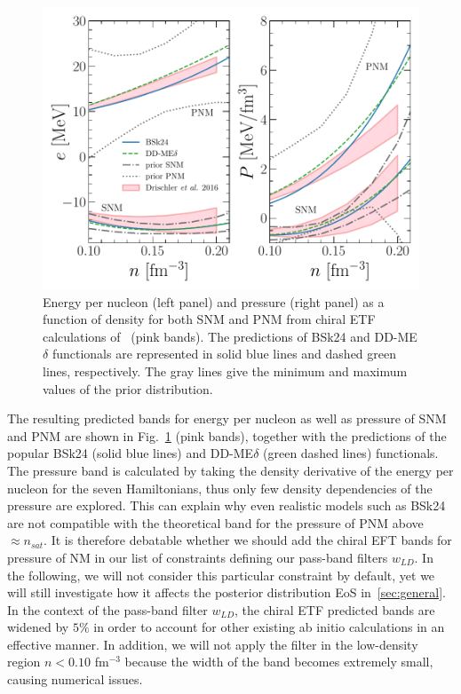 \begin{figure}[!t]
\begin{center}
  \includegraphics[width=0.9\linewidth]{figures/drischler.pdf}
\end{center}
\caption[Energy per nucleon and pressure of nuclear matter versus density from 
chiral effective field theory caclulations]{Energy per nucleon 
  (left panel) and pressure (right panel) as a function of density for both SNM 
  and PNM from chiral ETF calculations of~\cite{Drischler2016} (pink
bands). The predictions of BSk24 and DD-ME$\delta$ functionals are represented 
in solid blue lines and dashed green lines, respectively. The gray lines
give the minimum and maximum values of the prior 
distribution.}\label{fig:drischler}
\end{figure}

The resulting predicted bands for energy per nucleon as well as pressure of SNM
and PNM are shown in Fig.~\ref{fig:drischler} (pink bands), together with 
the predictions of the popular BSk24 (solid blue lines) and DD-ME$\delta$ 
(green dashed lines) functionals. 
The pressure band is calculated by taking the density derivative of the energy 
per nucleon for the seven Hamiltonians, thus only few density dependencies of 
the pressure are explored. This can explain why even realistic models such as 
BSk24 are not compatible with the theoretical band for the 
pressure of PNM above $\approx n_{sat}$. It is therefore debatable whether 
we should add the chiral EFT bands for pressure of NM in our list of
constraints defining our pass-band filters $w_{LD}$. In the following, we will 
not consider this particular constraint by default, yet we will still 
investigate how it affects the posterior distribution EoS in~\ref{sec:general}.
In the context of the pass-band filter $w_{LD}$, the chiral ETF predicted 
bands are widened by $5\%$ in order to account for other existing ab initio 
calculations in an effective manner. In addition, we will not apply the filter
in the low-density region $n < 0.10$ fm$^{-3}$ because the width of the band 
becomes extremely small, causing numerical issues.

